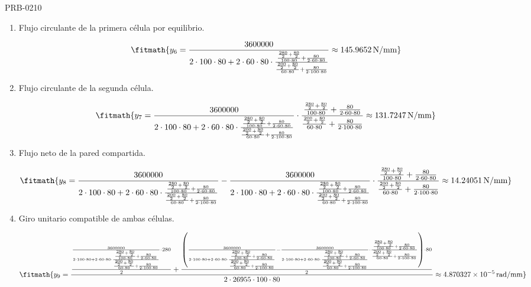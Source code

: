 \begin{studiumworked}{PRB-0210}
\begin{enumerate}
\[\fitmath{y_{5}=\frac{\frac{\frac{280}{2}+\frac{80}{2}}{100\cdot 80}+\frac{80}{2\cdot 60\cdot 80}}{\frac{\frac{200}{2}+\frac{80}{2}}{60\cdot 80}+\frac{80}{2\cdot 100\cdot 80}}\approx 0.902439\,}\]

\item Flujo circulante de la primera célula por equilibrio.

\[\fitmath{y_{6}=\frac{3600000}{2\cdot 100\cdot 80+2\cdot 60\cdot 80\cdot \frac{\frac{\frac{280}{2}+\frac{80}{2}}{100\cdot 80}+\frac{80}{2\cdot 60\cdot 80}}{\frac{\frac{200}{2}+\frac{80}{2}}{60\cdot 80}+\frac{80}{2\cdot 100\cdot 80}}}\approx 145.9652\,\mathrm{N/mm}}\]

\item Flujo circulante de la segunda célula.

\[\fitmath{y_{7}=\frac{3600000}{2\cdot 100\cdot 80+2\cdot 60\cdot 80\cdot \frac{\frac{\frac{280}{2}+\frac{80}{2}}{100\cdot 80}+\frac{80}{2\cdot 60\cdot 80}}{\frac{\frac{200}{2}+\frac{80}{2}}{60\cdot 80}+\frac{80}{2\cdot 100\cdot 80}}}\cdot \frac{\frac{\frac{280}{2}+\frac{80}{2}}{100\cdot 80}+\frac{80}{2\cdot 60\cdot 80}}{\frac{\frac{200}{2}+\frac{80}{2}}{60\cdot 80}+\frac{80}{2\cdot 100\cdot 80}}\approx 131.7247\,\mathrm{N/mm}}\]

\item Flujo neto de la pared compartida.

\[\fitmath{y_{8}=\frac{3600000}{2\cdot 100\cdot 80+2\cdot 60\cdot 80\cdot \frac{\frac{\frac{280}{2}+\frac{80}{2}}{100\cdot 80}+\frac{80}{2\cdot 60\cdot 80}}{\frac{\frac{200}{2}+\frac{80}{2}}{60\cdot 80}+\frac{80}{2\cdot 100\cdot 80}}}-\frac{3600000}{2\cdot 100\cdot 80+2\cdot 60\cdot 80\cdot \frac{\frac{\frac{280}{2}+\frac{80}{2}}{100\cdot 80}+\frac{80}{2\cdot 60\cdot 80}}{\frac{\frac{200}{2}+\frac{80}{2}}{60\cdot 80}+\frac{80}{2\cdot 100\cdot 80}}}\cdot \frac{\frac{\frac{280}{2}+\frac{80}{2}}{100\cdot 80}+\frac{80}{2\cdot 60\cdot 80}}{\frac{\frac{200}{2}+\frac{80}{2}}{60\cdot 80}+\frac{80}{2\cdot 100\cdot 80}}\approx 14.24051\,\mathrm{N/mm}}\]

\item Giro unitario compatible de ambas células.

\[\fitmath{y_{9}=\frac{\frac{\frac{3600000}{2\cdot 100\cdot 80+2\cdot 60\cdot 80\cdot \frac{\frac{\frac{280}{2}+\frac{80}{2}}{100\cdot 80}+\frac{80}{2\cdot 60\cdot 80}}{\frac{\frac{200}{2}+\frac{80}{2}}{60\cdot 80}+\frac{80}{2\cdot 100\cdot 80}}}\cdot 280}{2}+\frac{\left(\frac{3600000}{2\cdot 100\cdot 80+2\cdot 60\cdot 80\cdot \frac{\frac{\frac{280}{2}+\frac{80}{2}}{100\cdot 80}+\frac{80}{2\cdot 60\cdot 80}}{\frac{\frac{200}{2}+\frac{80}{2}}{60\cdot 80}+\frac{80}{2\cdot 100\cdot 80}}}-\frac{3600000}{2\cdot 100\cdot 80+2\cdot 60\cdot 80\cdot \frac{\frac{\frac{280}{2}+\frac{80}{2}}{100\cdot 80}+\frac{80}{2\cdot 60\cdot 80}}{\frac{\frac{200}{2}+\frac{80}{2}}{60\cdot 80}+\frac{80}{2\cdot 100\cdot 80}}}\cdot \frac{\frac{\frac{280}{2}+\frac{80}{2}}{100\cdot 80}+\frac{80}{2\cdot 60\cdot 80}}{\frac{\frac{200}{2}+\frac{80}{2}}{60\cdot 80}+\frac{80}{2\cdot 100\cdot 80}}\right)\cdot 80}{2}}{2\cdot 26955\cdot 100\cdot 80}\approx 4.870327\times10^{-5}\,\mathrm{rad/mm}}\]


\end{enumerate}
\end{studiumworked}
